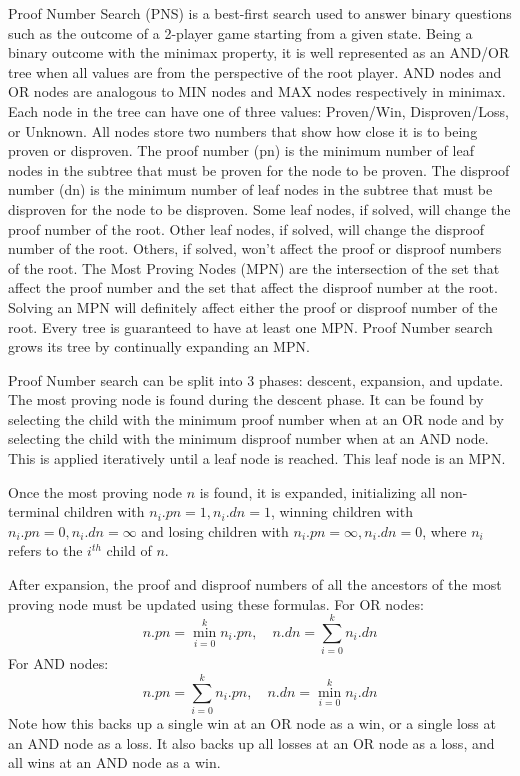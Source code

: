 Proof Number Search (PNS)\cite{allis1994PNS} is a best-first search used to answer binary questions such as the outcome of a 2-player game starting from a given state. Being a binary outcome with the minimax property, it is well represented as an AND/OR tree when all values are from the perspective of the root player. AND nodes and OR nodes are analogous to MIN nodes and MAX nodes respectively in minimax. Each node in the tree can have one of three values: Proven/Win, Disproven/Loss, or Unknown. All nodes store two numbers that show how close it is to being proven or disproven. The proof number (pn) is the minimum number of leaf nodes in the subtree that must be proven for the node to be proven. The disproof number (dn) is the minimum number of leaf nodes in the subtree that must be disproven for the node to be disproven. Some leaf nodes, if solved, will change the proof number of the root. Other leaf nodes, if solved, will change the disproof number of the root. Others, if solved, won't affect the proof or disproof numbers of the root. The Most Proving Nodes (MPN) are the intersection of the set that affect the proof number and the set that affect the disproof number at the root. Solving an MPN will definitely affect either the proof or disproof number of the root. Every tree is guaranteed to have at least one MPN. Proof Number search grows its tree by continually expanding an MPN.

Proof Number search can be split into 3 phases: descent, expansion, and update. The most proving node is found during the descent phase. It can be found by selecting the child with the minimum proof number when at an OR node and by selecting the child with the minimum disproof number when at an AND node. This is applied iteratively until a leaf node is reached. This leaf node is an MPN.

Once the most proving node $n$ is found, it is expanded, initializing all non-terminal children with $n_i.pn = 1, n_i.dn = 1$, winning children with $n_i.pn = 0, n_i.dn = \infty$ and losing children with $n_i.pn = \infty, n_i.dn = 0 $, where $n_i$ refers to the $i^{th}$ child of $n$.

After expansion, the proof and disproof numbers of all the ancestors of the most proving node must be updated using these formulas. For OR nodes: $$ n.pn = \displaystyle\min\limits_{i=0}^k n_i.pn,\quad n.dn = \displaystyle\sum\limits_{i=0}^k n_i.dn $$ For AND nodes: $$ n.pn = \displaystyle\sum\limits_{i=0}^k n_i.pn, \quad n.dn = \displaystyle\min\limits_{i=0}^k n_i.dn $$ Note how this backs up a single win at an OR node as a win, or a single loss at an AND node as a loss. It also backs up all losses at an OR node as a loss, and all wins at an AND node as a win. %


